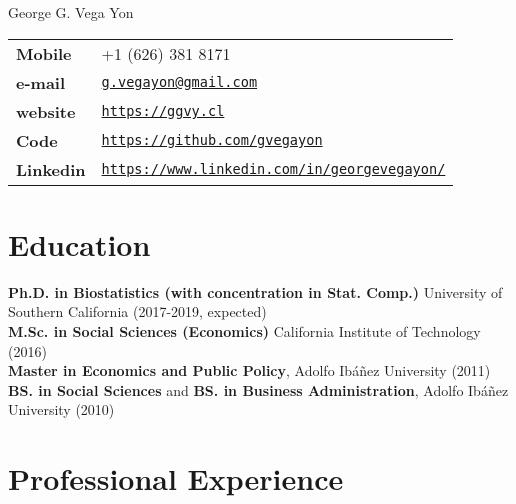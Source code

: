 \documentclass[letterpaper, 11pt]{article}
\def\name{George G. Vega Yon}
\renewenvironment{itemize}{
  \begin{list}{}{
    \setlength{\leftmargin}{0.45cm}
  }
}{
  \end{list}
}
\begin{document}
{\huge \name}


\vspace{0.25in}

\begin{minipage}{0.45\linewidth}
  \begin{tabular}{>{\bfseries}p{4cm}l}
    Mobile & +1 (626) 381 8171 \\
    e-mail & \href{mailto:g.vegayon@gmail.com}{\tt g.vegayon@gmail.com} \\
    website & \href{https://ggvy.cl}{\tt https://ggvy.cl} \\
    Code & \href{https://github.com/gvegayon}{\tt https://github.com/gvegayon}\\
    Linkedin & \href{https://www.linkedin.com/in/georgevegayon/}{\tt https://www.linkedin.com/in/georgevegayon/}
  \end{tabular}
\end{minipage}

\section*{Education}

\begin{itemize}
\item 
{\bf Ph.D. in Biostatistics (with concentration in Stat. Comp.)} University of Southern California (2017-2019, expected) \\
{\bf M.Sc. in Social Sciences (Economics)} California Institute of Technology (2016) \\
{\bf Master in Economics and Public Policy}, Adolfo Ib\'a\~nez University (2011) \\
{\bf BS. in Social Sciences} and {\bf BS. in Business Administration}, Adolfo Ib\'a\~nez University (2010)
\end{itemize}

\section*{Professional Experience}
\end{document}
